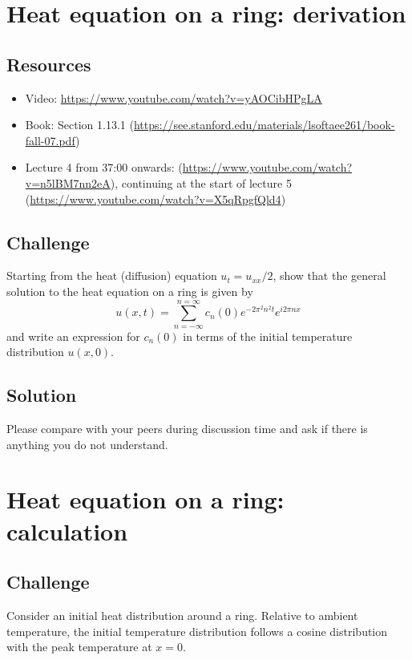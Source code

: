 \newpage
\section{Heat equation on a ring: derivation}
\label{sec:heateqnfc}

\subsection*{Resources}
\begin{itemize}
    \item Video: \url{https://www.youtube.com/watch?v=yAOCibHPgLA}
    \item Book: Section 1.13.1 (\url{https://see.stanford.edu/materials/lsoftaee261/book-fall-07.pdf})
    \item Lecture 4 from 37:00 onwards: (\url{https://www.youtube.com/watch?v=n5lBM7nn2eA}), continuing at the start of lecture 5 (\url{https://www.youtube.com/watch?v=X5qRpgfQld4})
\end{itemize}

\subsection*{Challenge}
Starting from the heat (diffusion) equation $u_t = u_{xx}/2$, show that the general solution to the heat equation on a ring is given by
\begin{equation}
    u(x,t) = \sum_{n=-\infty}^{n=\infty} c_n(0) e^{-2 \pi^2 n^2 t} e^{i 2 \pi n x}
\end{equation}
and write an expression for $c_n(0)$ in terms of the initial temperature distribution $u(x,0)$.

\subsection*{Solution}
Please compare with your peers during discussion time and ask if there is anything you do not understand.




\newpage
\section{Heat equation on a ring: calculation}
\label{sec:heateqn}

\subsection*{Challenge}
Consider an initial heat distribution around a ring. Relative to ambient temperature, the initial temperature distribution follows a cosine distribution with the peak temperature at $x=0$.

